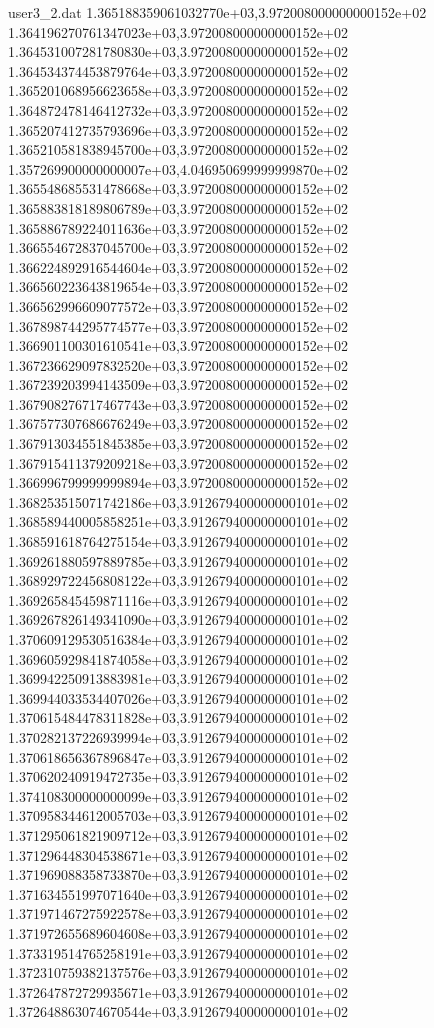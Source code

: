 \begin{filecontents}{user3_2.dat}
1.365188359061032770e+03,3.972008000000000152e+02
1.364196270761347023e+03,3.972008000000000152e+02
1.364531007281780830e+03,3.972008000000000152e+02
1.364534374453879764e+03,3.972008000000000152e+02
1.365201068956623658e+03,3.972008000000000152e+02
1.364872478146412732e+03,3.972008000000000152e+02
1.365207412735793696e+03,3.972008000000000152e+02
1.365210581838945700e+03,3.972008000000000152e+02
1.357269900000000007e+03,4.046950699999999870e+02
1.365548685531478668e+03,3.972008000000000152e+02
1.365883818189806789e+03,3.972008000000000152e+02
1.365886789224011636e+03,3.972008000000000152e+02
1.366554672837045700e+03,3.972008000000000152e+02
1.366224892916544604e+03,3.972008000000000152e+02
1.366560223643819654e+03,3.972008000000000152e+02
1.366562996609077572e+03,3.972008000000000152e+02
1.367898744295774577e+03,3.972008000000000152e+02
1.366901100301610541e+03,3.972008000000000152e+02
1.367236629097832520e+03,3.972008000000000152e+02
1.367239203994143509e+03,3.972008000000000152e+02
1.367908276717467743e+03,3.972008000000000152e+02
1.367577307686676249e+03,3.972008000000000152e+02
1.367913034551845385e+03,3.972008000000000152e+02
1.367915411379209218e+03,3.972008000000000152e+02
1.366996799999999894e+03,3.972008000000000152e+02
1.368253515071742186e+03,3.912679400000000101e+02
1.368589440005858251e+03,3.912679400000000101e+02
1.368591618764275154e+03,3.912679400000000101e+02
1.369261880597889785e+03,3.912679400000000101e+02
1.368929722456808122e+03,3.912679400000000101e+02
1.369265845459871116e+03,3.912679400000000101e+02
1.369267826149341090e+03,3.912679400000000101e+02
1.370609129530516384e+03,3.912679400000000101e+02
1.369605929841874058e+03,3.912679400000000101e+02
1.369942250913883981e+03,3.912679400000000101e+02
1.369944033534407026e+03,3.912679400000000101e+02
1.370615484478311828e+03,3.912679400000000101e+02
1.370282137226939994e+03,3.912679400000000101e+02
1.370618656367896847e+03,3.912679400000000101e+02
1.370620240919472735e+03,3.912679400000000101e+02
1.374108300000000099e+03,3.912679400000000101e+02
1.370958344612005703e+03,3.912679400000000101e+02
1.371295061821909712e+03,3.912679400000000101e+02
1.371296448304538671e+03,3.912679400000000101e+02
1.371969088358733870e+03,3.912679400000000101e+02
1.371634551997071640e+03,3.912679400000000101e+02
1.371971467275922578e+03,3.912679400000000101e+02
1.371972655689604608e+03,3.912679400000000101e+02
1.373319514765258191e+03,3.912679400000000101e+02
1.372310759382137576e+03,3.912679400000000101e+02
1.372647872729935671e+03,3.912679400000000101e+02
1.372648863074670544e+03,3.912679400000000101e+02

\end{filecontents}
